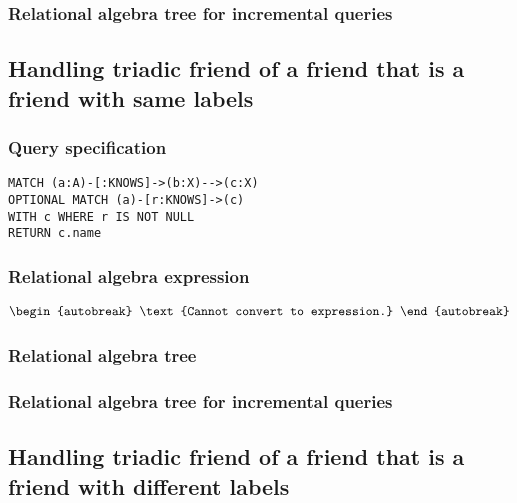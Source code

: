 
\subsubsection*{Relational algebra tree for incremental queries}


\subsection{Handling triadic friend of a friend that is a friend with same labels}

\subsubsection*{Query specification}

\begin{lstlisting}
MATCH (a:A)-[:KNOWS]->(b:X)-->(c:X)
OPTIONAL MATCH (a)-[r:KNOWS]->(c)
WITH c WHERE r IS NOT NULL
RETURN c.name
\end{lstlisting}

\subsubsection*{Relational algebra expression}

\begin{align*}
\begin{autobreak}
\text{Cannot convert to expression.}
\end{autobreak}
\end{align*}

\subsubsection*{Relational algebra tree}


\subsubsection*{Relational algebra tree for incremental queries}


\subsection{Handling triadic friend of a friend that is a friend with different labels}


